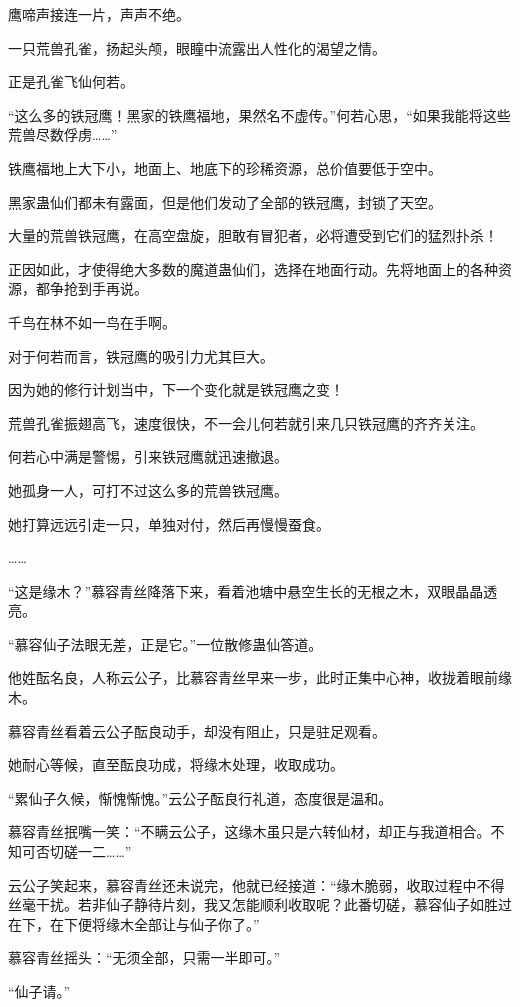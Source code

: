 \begin{this_body}
鹰啼声接连一片，声声不绝。

一只荒兽孔雀，扬起头颅，眼瞳中流露出人性化的渴望之情。

正是孔雀飞仙何若。

“这么多的铁冠鹰！黑家的铁鹰福地，果然名不虚传。”何若心思，“如果我能将这些荒兽尽数俘虏……”

铁鹰福地上大下小，地面上、地底下的珍稀资源，总价值要低于空中。

黑家蛊仙们都未有露面，但是他们发动了全部的铁冠鹰，封锁了天空。

大量的荒兽铁冠鹰，在高空盘旋，胆敢有冒犯者，必将遭受到它们的猛烈扑杀！

正因如此，才使得绝大多数的魔道蛊仙们，选择在地面行动。先将地面上的各种资源，都争抢到手再说。

千鸟在林不如一鸟在手啊。

对于何若而言，铁冠鹰的吸引力尤其巨大。

因为她的修行计划当中，下一个变化就是铁冠鹰之变！

荒兽孔雀振翅高飞，速度很快，不一会儿何若就引来几只铁冠鹰的齐齐关注。

何若心中满是警惕，引来铁冠鹰就迅速撤退。

她孤身一人，可打不过这么多的荒兽铁冠鹰。

她打算远远引走一只，单独对付，然后再慢慢蚕食。

……

“这是缘木？”慕容青丝降落下来，看着池塘中悬空生长的无根之木，双眼晶晶透亮。

“慕容仙子法眼无差，正是它。”一位散修蛊仙答道。

他姓酝名良，人称云公子，比慕容青丝早来一步，此时正集中心神，收拢着眼前缘木。

慕容青丝看着云公子酝良动手，却没有阻止，只是驻足观看。

她耐心等候，直至酝良功成，将缘木处理，收取成功。

“累仙子久候，惭愧惭愧。”云公子酝良行礼道，态度很是温和。

慕容青丝抿嘴一笑：“不瞒云公子，这缘木虽只是六转仙材，却正与我道相合。不知可否切磋一二……”

云公子笑起来，慕容青丝还未说完，他就已经接道：“缘木脆弱，收取过程中不得丝毫干扰。若非仙子静待片刻，我又怎能顺利收取呢？此番切磋，慕容仙子如胜过在下，在下便将缘木全部让与仙子你了。”

慕容青丝摇头：“无须全部，只需一半即可。”

“仙子请。”


\end{this_body}
